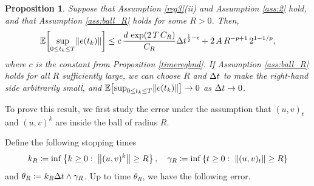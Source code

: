 \documentclass[11pt, twoside]{report}
\newtheorem{proposition}[theorem]{Proposition}
\begin{document}
\begin{proposition}\label{prop:error_discrete}
    Suppose that Assumption \ref{reg3}(ii) and Assumption \ref{ass:2} hold, and that Assumption \ref{ass:ball_R} holds for some $R>0$. Then, 
      $$
\EE\bp{ \sup_{0\leq t_k\leq T} \norm{e(t_k)} }\leq  c\,\frac{d \,\exp\pa{2\,T\, C_R}}{C_R}  \deltat^{\frac12-\epsilon} +  2\,A\, R^{-p+1}\, 2^{1-1/p},
$$
where $c$ is the constant from Proposition \ref{timeregbnd}.  If Assumption \ref{ass:ball_R} holds for all $R$ sufficiently large,  we can choose $R$ and ${\Delta t}$ to make the right-hand side arbitrarily small, and $\EE\bp{ \sup_{0\leq t_k\leq T} \norm{e(t_k)} }\to 0$ as ${\Delta t}\to 0$.
\end{proposition}
To prove this result, we first study the error under the assumption that $(u,v)_t$ and $(u,v)^k$ are inside the ball of radius $R$.

Define the following stopping times
\begin{align}\label{st}
    k_R \coloneq \inf\left\{k\geq 0:\; \left\lVert( u, v)^k\right\rVert \geq R\right\}, \quad \gamma_R \coloneq \inf\left\{t\geq 0:\; \left\lVert(u,v)_t\right\rVert \geq R\right\}
\end{align}
and $\theta_R \coloneq k_R {\Delta t} \wedge \gamma_R$.
%
Up to time $\theta_R$, we have the following error.
\end{document}
